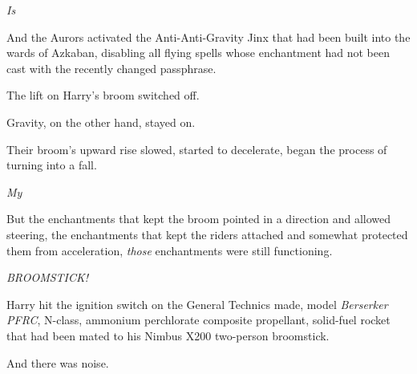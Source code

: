 \emph{Is{\el}}

And the Aurors activated the Anti-Anti-Gravity Jinx that had been built into
the wards of Azkaban, disabling all flying spells whose enchantment had not
been cast with the recently changed passphrase.

The lift on Harry's broom switched off.

Gravity, on the other hand, stayed on.

Their broom's upward rise slowed, started to decelerate, began the process of
turning into a fall.

\emph{My{\el}}

But the enchantments that kept the broom pointed in a direction and allowed
steering, the enchantments that kept the riders attached and somewhat protected
them from acceleration, \emph{those} enchantments were still functioning.

\emph{BROOMSTICK!}

Harry hit the ignition switch on the General Technics made, model
\emph{Berserker PFRC}, N-class, ammonium perchlorate composite propellant,
solid-fuel rocket that had been mated to his Nimbus X200 two-person broomstick.

And there was noise.
